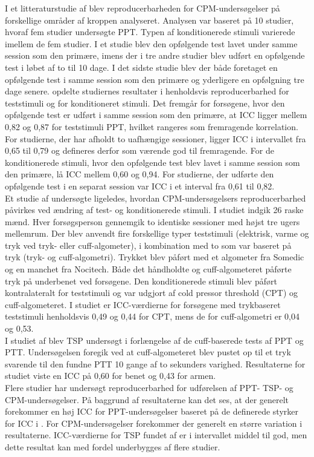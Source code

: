 I et litteraturstudie af  blev reproducerbarheden for CPM-undersøgelser på forskellige områder af kroppen analyseret. Analysen var baseret på 10 studier, hvoraf fem studier undersøgte PPT. Typen af konditionerede stimuli varierede imellem de fem studier. I et studie blev den opfølgende test lavet under samme session som den primære, imens der i tre andre studier blev udført en opfølgende test i løbet af to til 10 dage. I det sidste studie blev der både foretaget en opfølgende test i samme session som den primære og yderligere en opfølgning tre dage senere.  opdelte studiernes resultater i henholdsvis reproducerbarhed for teststimuli og for konditioneret stimuli. Det fremgår for forsøgene, hvor den opfølgende test er udført i samme session som den primære, at ICC ligger mellem 0,82 og 0,87 for teststimuli PPT, hvilket rangeres som fremragende korrelation. For studierne, der har afholdt to uafhængige sessioner, ligger ICC i intervallet fra 0,65 til 0,79 og defineres derfor som værende god til fremragende. For de konditionerede stimuli, hvor den opfølgende test blev lavet i samme session som den primære, lå ICC mellem 0,60 og 0,94. For studierne, der udførte den opfølgende test i en separat session var ICC i et interval fra 0,61 til 0,82. \citep{Kennedy2016} \\ 
Et studie af  undersøgte ligeledes, hvordan CPM-undersøgelsers reproducerbarhed påvirkes ved ændring af test- og konditionerede stimuli. I studiet indgik 26 raske mænd. Hver forsøgsperson gennemgik to identiske sessioner med højst tre ugers mellemrum. Der blev anvendt fire forskellige typer teststimuli (elektrisk, varme og tryk ved tryk- eller cuff-algometer), i kombination med to som var baseret på tryk (tryk- og cuff-algometri). Trykket blev påført med et algometer fra Somedic og en manchet fra Nocitech. Både det håndholdte og cuff-algometeret påførte tryk på underbenet ved forsøgene. Den konditionerede stimuli blev påført kontralateralt for teststimuli og var udgjort af cold pressor threshold (CPT) og cuff-algometeret. I studiet er ICC-værdierne for forsøgene med trykbaseret teststimuli henholdsvis 0,49 og 0,44 for CPT, mens de for cuff-algometri er 0,04 og 0,53. \citep{Imai2016}\\ 
I studiet af  blev TSP undersøgt i forlængelse af de cuff-baserede tests af PPT og PTT. Undersøgelsen foregik ved at cuff-algometeret blev pustet op til et tryk svarende til den fundne PTT 10 gange af to sekunders varighed. Resultaterne for studiet viste en ICC på 0,60 for benet og 0,43 for armen. \citep{Nielsen2015} \\
Flere studier har undersøgt reproducerbarhed for udførelsen af PPT- TSP- og CPM-undersøgelser. På baggrund af resultaterne kan det ses, at der generelt forekommer en høj ICC for PPT-undersøgelser baseret på de definerede styrker for ICC i . For CPM-undersøgelser forekommer der generelt en større variation i resultaterne. ICC-værdierne for TSP fundet af  er i intervallet middel til god, men dette resultat kan med fordel underbygges af flere studier.

